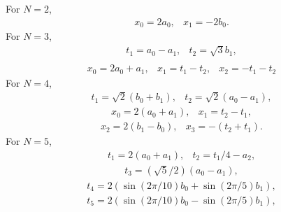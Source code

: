 \documentclass[fleqn,12pt]{article}
\begin{document}
For $N=2$,
%
\begin{equation}
\begin{array}{ll}
x_0 = 2 a_0, & x_1 = - 2 b_0 .
\end{array}
\end{equation}
%
For $N=3$,
%
\begin{equation}
\begin{array}{ll}
t_1 = a_0 - a_1, & t_2 = \sqrt{3} b_1, \\
\end{array}
\end{equation}
\begin{equation}
\begin{array}{lll}
x_0 = 2 a_0 + a_1, & x_1 = t_1 - t_2, & x_2 = - t_1 - t_2 
\end{array}
\end{equation}
%
For $N=4$,
\begin{equation}
\begin{array}{ll}
t_1 = \sqrt{2} (b_0 + b_1), & t_2 = \sqrt{2} (a_0 - a_1),
\end{array}
\end{equation}
\begin{equation}
\begin{array}{ll}
x_0 = 2(a_0 + a_1), & x_1 = t_2 - t_1 , 
\end{array}
\end{equation}
\begin{equation}
\begin{array}{ll}
x_2 = 2(b_1 - b_0), & x_3 = -(t_2 + t_1).
\end{array}
\end{equation}
%
For $N=5$,
%
\begin{equation}
\begin{array}{ll}
t_1 = 2 (a_0 + a_1), & t_2 = t_1 / 4 - a_2,
\end{array}
\end{equation}
\begin{equation}
\begin{array}{ll}
t_3 = (\sqrt{5}/2) (a_0 - a_1), 
\end{array}
\end{equation}
\begin{equation}
\begin{array}{l}
t_4 = 2(\sin(2\pi/10) b_0 + \sin(2\pi/5) b_1),
\end{array}
\end{equation}
\begin{equation}
\begin{array}{l}
t_5 = 2(\sin(2\pi/10) b_0 - \sin(2\pi/5) b_1),
\end{array}
\end{equation}
\end{document}
